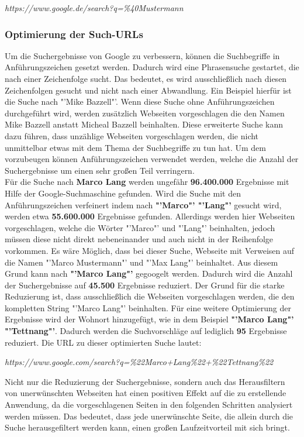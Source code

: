 			\textit{https://www.google.de/search?q=\%40Mustermann}
			
			\subsubsection{Optimierung der Such-URLs}
			\label{subsubsec:URLOptimieren}
			Um die Suchergebnisse von Google zu verbessern, können die Suchbegriffe in Anführungszeichen gesetzt werden. Dadurch wird eine Phrasensuche gestartet, die nach einer Zeichenfolge sucht. Das bedeutet, es wird ausschließlich nach diesen Zeichenfolgen gesucht und nicht nach einer Abwandlung. Ein Beispiel hierfür ist die Suche nach "'Mike Bazzell"'. Wenn diese Suche ohne Anführungszeichen durchgeführt wird, werden zusätzlich Webseiten vorgeschlagen die den Namen Mike Bazzell anstatt Micheal Bazzell beinhalten. Diese erweiterte Suche kann dazu führen, dass unzählige Webseiten vorgeschlagen werden, die nicht unmittelbar etwas mit dem Thema der Suchbegriffe zu tun hat. Um dem vorzubeugen können Anführungszeichen verwendet werden, welche die Anzahl der Suchergebnisse um einen sehr großen Teil verringern. \cite{Bazzell}\\
			Für die Suche nach \textbf{Marco Lang} werden ungefähr \textbf{96.400.000} Ergebnisse mit Hilfe der Google-Suchmaschine gefunden. Wird die Suche mit den Anführungszeichen verfeinert indem nach \textbf{"'Marco"' "'Lang"'} gesucht wird, werden etwa \textbf{55.600.000} Ergebnisse gefunden. Allerdings werden hier Webseiten vorgeschlagen, welche die Wörter "'Marco"' und "'Lang"' beinhalten, jedoch müssen diese nicht direkt nebeneinander und auch nicht in der Reihenfolge vorkommen. Es wäre Möglich, dass bei dieser Suche, Webseite mit Verweisen auf die Namen "'Marco Mustermann"' und "'Max Lang"' beinhaltet. Aus diesem Grund kann nach \textbf{"'Marco Lang"'} gegoogelt werden. Dadurch wird die Anzahl der Suchergebnisse auf \textbf{45.500} Ergebnisse reduziert. Der Grund für die starke Reduzierung ist, dass ausschließlich die Webseiten vorgeschlagen werden, die den kompletten String "'Marco Lang"' beinhalten. Für eine weitere Optimierung der Ergebnisse wird der Wohnort hinzugefügt, wie in dem Beispiel \textbf{"'Marco Lang"' "'Tettnang"'}. Dadurch werden die Suchvorschläge auf lediglich \textbf{95} Ergebnisse reduziert. Die URL zu dieser optimierten Suche lautet: 
			
			\textit{https://www.google.com/search?q=\%22Marco+Lang\%22+\%22Tettnang\%22}
			
			Nicht nur die Reduzierung der Suchergebnisse, sondern auch das Herausfiltern von unerwünschten Webseiten hat einen positiven Effekt auf die zu erstellende Anwendung, da die vorgeschlagenen Seiten in den folgenden Schritten analysiert werden müssen. Das bedeutet, dass jede unerwünschte Seite, die allein durch die Suche herausgefiltert werden kann, einen großen Laufzeitvorteil mit sich bringt. 
			
